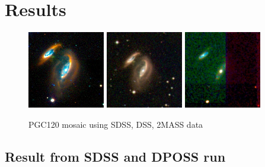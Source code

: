 \documentclass[5p]{elsarticle}
\begin{document}
\section{Results}
\begin{figure}[t!]
\centering
	\includegraphics[width=0.3\textwidth]{figures/SDSS_120_LOW}
	\includegraphics[width=0.3\textwidth]{figures/DSS_120_BEST}	
	\includegraphics[width=0.3\textwidth]{figures/2MASS_120_BEST}
	\caption{PGC120 mosaic using SDSS, DSS, 2MASS data }
	\label{fig:comparison}
\end{figure}

\subsection{Result from SDSS and DPOSS run}
\end{document}
